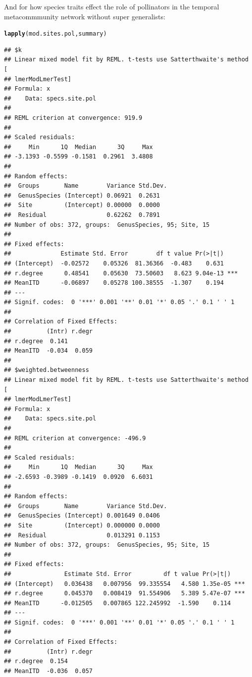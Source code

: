 \documentclass{article}\usepackage[]{graphicx}\usepackage[]{color}
\makeatletter
\newcommand{\hlstd}[1]{\textcolor[rgb]{0.345,0.345,0.345}{#1}}%
\newcommand{\hlkwd}[1]{\textcolor[rgb]{0.737,0.353,0.396}{\textbf{#1}}}%
\newenvironment{kframe}{%
 \def\at@end@of@kframe{}%
 \ifinner\ifhmode%
  \def\at@end@of@kframe{\end{minipage}}%
  \begin{minipage}{\columnwidth}%
 \fi\fi%
 \def\FrameCommand##1{\hskip\@totalleftmargin \hskip-\fboxsep
 \colorbox{shadecolor}{##1}\hskip-\fboxsep
     \hskip-\linewidth \hskip-\@totalleftmargin \hskip\columnwidth}%
 \MakeFramed {\advance\hsize-\width
   \@totalleftmargin\z@ \linewidth\hsize
   \@setminipage}}%
 {\par\unskip\endMakeFramed%
 \at@end@of@kframe}
\newenvironment{knitrout}{}{} %
\makeatother
\begin{document}
\clearpage

And for how species traits effect the role of pollinators in
the temporal metacommmunity network without super generalists: 
\begin{knitrout}
\color{fgcolor}\begin{kframe}
\begin{alltt}
\hlkwd{lapply}\hlstd{(mod.sites.pol, summary)}
\end{alltt}
\begin{verbatim}
## $k
## Linear mixed model fit by REML. t-tests use Satterthwaite's method [
## lmerModLmerTest]
## Formula: x
##    Data: specs.site.pol
## 
## REML criterion at convergence: 919.9
## 
## Scaled residuals: 
##     Min      1Q  Median      3Q     Max 
## -3.1393 -0.5599 -0.1581  0.2961  3.4808 
## 
## Random effects:
##  Groups       Name        Variance Std.Dev.
##  GenusSpecies (Intercept) 0.06921  0.2631  
##  Site         (Intercept) 0.00000  0.0000  
##  Residual                 0.62262  0.7891  
## Number of obs: 372, groups:  GenusSpecies, 95; Site, 15
## 
## Fixed effects:
##              Estimate Std. Error        df t value Pr(>|t|)    
## (Intercept)  -0.02572    0.05326  81.36366  -0.483    0.631    
## r.degree      0.48541    0.05630  73.50603   8.623 9.04e-13 ***
## MeanITD      -0.06897    0.05278 100.38555  -1.307    0.194    
## ---
## Signif. codes:  0 '***' 0.001 '**' 0.01 '*' 0.05 '.' 0.1 ' ' 1
## 
## Correlation of Fixed Effects:
##          (Intr) r.degr
## r.degree  0.141       
## MeanITD  -0.034  0.059
## 
## $weighted.betweenness
## Linear mixed model fit by REML. t-tests use Satterthwaite's method [
## lmerModLmerTest]
## Formula: x
##    Data: specs.site.pol
## 
## REML criterion at convergence: -496.9
## 
## Scaled residuals: 
##     Min      1Q  Median      3Q     Max 
## -2.6593 -0.3989 -0.1419  0.0920  6.6031 
## 
## Random effects:
##  Groups       Name        Variance Std.Dev.
##  GenusSpecies (Intercept) 0.001649 0.0406  
##  Site         (Intercept) 0.000000 0.0000  
##  Residual                 0.013291 0.1153  
## Number of obs: 372, groups:  GenusSpecies, 95; Site, 15
## 
## Fixed effects:
##               Estimate Std. Error         df t value Pr(>|t|)    
## (Intercept)   0.036438   0.007956  99.335554   4.580 1.35e-05 ***
## r.degree      0.045370   0.008419  91.554906   5.389 5.47e-07 ***
## MeanITD      -0.012505   0.007865 122.245992  -1.590    0.114    
## ---
## Signif. codes:  0 '***' 0.001 '**' 0.01 '*' 0.05 '.' 0.1 ' ' 1
## 
## Correlation of Fixed Effects:
##          (Intr) r.degr
## r.degree  0.154       
## MeanITD  -0.036  0.057
\end{verbatim}
\end{kframe}
\end{knitrout}
\clearpage
\end{document}
